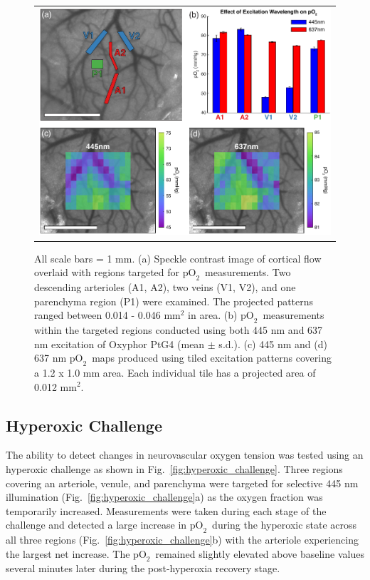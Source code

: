 \documentclass[12pt]{spieman}  %
\newcommand{\pO}{\ensuremath{\text{pO}_2}} 	            %
\begin{document}
\begin{spacing}{2}
\begin{figure}
    \begin{center}
        \begin{tabular}{c}
            \includegraphics[width=6.25in]{Figure3.pdf}
        \end{tabular}
    \end{center}
    \caption {
        \label{fig:static_oxygen}
        All scale bars = 1 mm. (a) Speckle contrast image of cortical flow overlaid with regions targeted for \pO\ measurements. Two descending arterioles (A1, A2), two veins (V1, V2), and one parenchyma region (P1) were examined. The projected patterns ranged between 0.014 - 0.046 mm$^2$ in area. (b) \pO\ measurements within the targeted regions conducted using both 445 nm and 637 nm excitation of Oxyphor PtG4 (mean $\pm$ s.d.). (c) 445 nm and (d) 637 nm \pO\ maps produced using tiled excitation patterns covering a 1.2 x 1.0 mm area. Each individual tile has a projected area of 0.012 mm$^2$.
    }
\end{figure}


\subsection{Hyperoxic Challenge}
The ability to detect changes in neurovascular oxygen tension was tested using an hyperoxic challenge as shown in Fig.~\ref{fig:hyperoxic_challenge}. Three regions covering an arteriole, venule, and parenchyma were targeted for selective 445 nm illumination (Fig.~\ref{fig:hyperoxic_challenge}a) as the oxygen fraction was temporarily increased. Measurements were taken during each stage of the challenge and detected a large increase in \pO\ during the hyperoxic state across all three regions (Fig.~\ref{fig:hyperoxic_challenge}b) with the arteriole experiencing the largest net increase. The \pO\ remained slightly elevated above baseline values several minutes later during the post-hyperoxia recovery stage.


\end{spacing}
\end{document}
